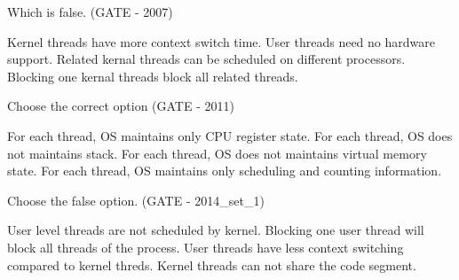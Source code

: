 \begin{minipage}{\linewidth}

  \question Which is false. (GATE -  2007)

  \begin{choices}
    \choice Kernel threads have more context switch time.
    \choice User threads need no hardware support.
    \choice Related kernal threads can be scheduled on different processors.
    \choice Blocking one kernal threads block all related threads.
  \end{choices}


  \end{minipage}

\vspace{0.08in}



\begin{minipage}{\linewidth}

  \question  Choose the correct option (GATE - 2011)

  \begin{choices}
    \choice For each thread, OS maintains only CPU register state.
    \choice For each thread, OS does not maintains  stack.
    \choice For each thread, OS does not maintains  virtual memory state.
    \choice For each thread, OS maintains only scheduling and counting information.
  \end{choices}


  \end{minipage}

\vspace{0.08in}



\begin{minipage}{\linewidth}

  \question  Choose the false option. (GATE - 2014\_set\_1)

  \begin{choices}
    \choice User level threads are not scheduled by kernel.
    \choice Blocking one user thread will block all threads of the process.
    \choice User threads have less context switching compared to kernel threds.
    \choice Kernel threads can not share the code segment.
  \end{choices}


  \end{minipage}

